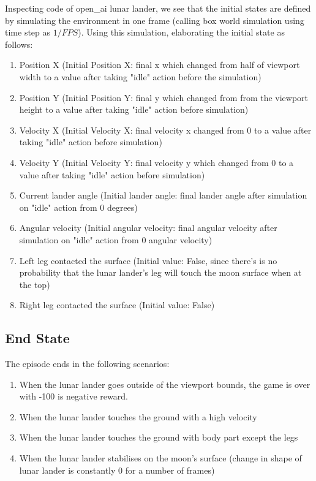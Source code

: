 Inspecting code of open\_ai lunar lander, we see that the initial states are defined by simulating the environment in one frame (calling box world simulation using time step as $1/FPS$). Using this simulation, elaborating the initial state as follows:

\begin{enumerate}
\item Position X (Initial Position X: final x which changed from half of viewport width to a value after taking "idle" action before the simulation)
\item Position Y (Initial Position Y: final y which changed from from the viewport height to a value after taking "idle" action before simulation)
\item Velocity X (Initial Velocity X: final velocity x changed from 0 to a value after taking "idle" action before simulation)
\item Velocity Y (Initial Velocity Y: final velocity y which changed from 0 to a value after taking "idle" action before simulation)
\item Current lander angle (Initial lander angle: final lander angle after simulation on "idle" action from 0 degrees)
\item Angular velocity (Initial angular velocity: final angular velocity after simulation on "idle" action from 0 angular velocity)
\item Left leg contacted the surface (Initial value: False, since there's is no probability that the lunar lander's leg will touch the moon surface when at the top)
\item Right leg contacted the surface (Initial value: False)
\end{enumerate}

\subsection{End State}

The episode ends in the following scenarios:

\begin{enumerate}
\item  When the lunar lander goes outside of the viewport bounds, the game is over with -100 is negative reward.
\item  When the lunar lander touches the ground with a high velocity
\item When the lunar lander touches the ground with body part except the legs
\item When the lunar lander stabilises on the moon's surface (change in shape of lunar lander is constantly 0 for a number of frames)
\end{enumerate}

